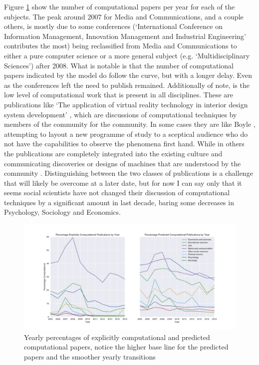 \documentclass[12pt, a4paper]{article}
\begin{document}
Figure \ref{temporal} show the number of computational papers per year for each of the subjects. The peak around 2007 for Media and Communications, and a couple others, is mostly due to some conferences (`International Conference on Information Management, Innovation Management and Industrial Engineering' contributes the most) being reclassified from Media and Communications to either a pure computer science or a more general subject (e.g. `Multidisciplinary Sciences') after 2008. What is notable is that the number of computational papers indicated by the model do follow the curve, but with a longer delay. Even as the conferences left the need to publish remained. Additionally of note, is the low level of computational work that is present in all disciplines. These are publications like `The application of virtual reality technology in interior design system development' \citep{chuanrong2016application}, which are discussions of computational techniques by members of the community for the community. In some cases they are like Boyle \citep{shapin1985leviathan}, attempting to layout a new programme of study to a sceptical audience who do not have the capabilities to observe the phenomena first hand. While in others the publications are completely integrated into the existing culture and communicating discoveries or designs of machines that are understood by the community \citep{cetina2009epistemic}. Distinguishing between the two classes of publications is a challenge that will likely be overcome at a later date, but for now I can say only that it seems social scientists have not changed their discussion of computational  techniques by a significant amount in last decade, baring some decreases in Psychology, Sociology and Economics.

\begin{figure}[H]
	\centering
	\begin{adjustbox}{center}
		\includegraphics[width=1.2\textwidth]{temporal}
	\end{adjustbox}
	\caption{Yearly percentages of explicitly computational and predicted computational papers, notice the higher base line for the predicted papers and the smoother yearly transitions }\label{temporal}
\end{figure}
\end{document}
